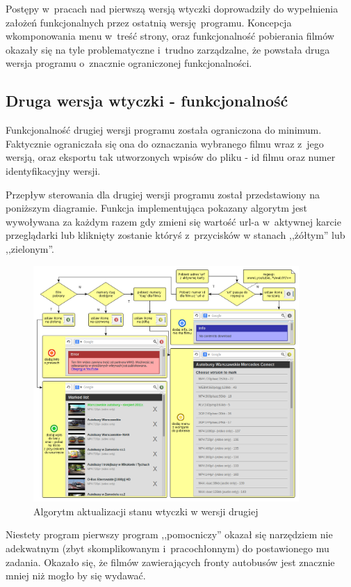 Postępy w~pracach nad pierwszą wersją wtyczki doprowadziły do wypełnienia
założeń funkcjonalnych przez ostatnią wersję programu. Koncepcja wkomponowania
menu w~treść strony, oraz funkcjonalność pobierania filmów okazały się
na tyle problematyczne i~trudno zarządzalne, że powstała druga wersja programu
o~znacznie ograniczonej funkcjonalności.

\subsection{Druga wersja wtyczki - funkcjonalność}

Funkcjonalność drugiej wersji programu została ograniczona do minimum. Faktycznie
ograniczała się ona do oznaczania wybranego filmu wraz z~jego wersją, oraz
eksportu tak utworzonych wpisów do pliku - id filmu oraz numer identyfikacyjny wersji.

Przepływ sterowania dla drugiej wersji programu został przedstawiony na poniższym
diagramie. Funkcja implementująca pokazany algorytm jest wywoływana za każdym razem
gdy zmieni się wartość url-a w~aktywnej karcie przeglądarki lub kliknięty zostanie
któryś z~przycisków w stanach ,,żółtym'' lub ,,zielonym''.

\begin{figure}[h!]
    \caption{Algorytm aktualizacji stanu wtyczki w wersji drugiej}
    \centering
    \includegraphics[width=0.9\textwidth]{img/env_yt_marker}
\end{figure}

Niestety program pierwszy program ,,pomocniczy'' okazał się narzędziem nie adekwatnym
(zbyt skomplikowanym i~pracochłonnym) do postawionego mu zadania. Okazało się, że
filmów zawierających fronty autobusów jest znacznie mniej niż mogło by się wydawać.

